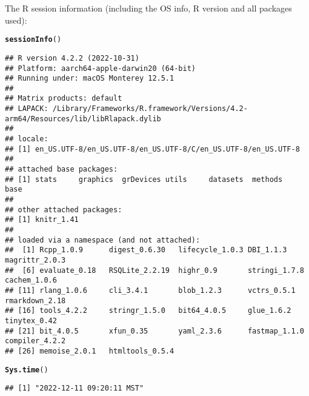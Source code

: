 \documentclass{article}\usepackage[]{graphicx}\usepackage[]{xcolor}
\makeatletter
\newcommand{\hlstd}[1]{\textcolor[rgb]{0.345,0.345,0.345}{#1}}%
\newcommand{\hlkwd}[1]{\textcolor[rgb]{0.737,0.353,0.396}{\textbf{#1}}}%
\newenvironment{kframe}{%
 \def\at@end@of@kframe{}%
 \ifinner\ifhmode%
  \def\at@end@of@kframe{\end{minipage}}%
  \begin{minipage}{\columnwidth}%
 \fi\fi%
 \def\FrameCommand##1{\hskip\@totalleftmargin \hskip-\fboxsep
 \colorbox{shadecolor}{##1}\hskip-\fboxsep
     \hskip-\linewidth \hskip-\@totalleftmargin \hskip\columnwidth}%
 \MakeFramed {\advance\hsize-\width
   \@totalleftmargin\z@ \linewidth\hsize
   \@setminipage}}%
 {\par\unskip\endMakeFramed%
 \at@end@of@kframe}
\newenvironment{knitrout}{}{} %
\makeatother
\begin{document}
The R session information (including the OS info, R version and all
packages used):

\begin{knitrout}
\color{fgcolor}\begin{kframe}
\begin{alltt}
\hlkwd{sessionInfo}\hlstd{()}
\end{alltt}
\begin{verbatim}
## R version 4.2.2 (2022-10-31)
## Platform: aarch64-apple-darwin20 (64-bit)
## Running under: macOS Monterey 12.5.1
## 
## Matrix products: default
## LAPACK: /Library/Frameworks/R.framework/Versions/4.2-arm64/Resources/lib/libRlapack.dylib
## 
## locale:
## [1] en_US.UTF-8/en_US.UTF-8/en_US.UTF-8/C/en_US.UTF-8/en_US.UTF-8
## 
## attached base packages:
## [1] stats     graphics  grDevices utils     datasets  methods   base     
## 
## other attached packages:
## [1] knitr_1.41
## 
## loaded via a namespace (and not attached):
##  [1] Rcpp_1.0.9      digest_0.6.30   lifecycle_1.0.3 DBI_1.1.3       magrittr_2.0.3 
##  [6] evaluate_0.18   RSQLite_2.2.19  highr_0.9       stringi_1.7.8   cachem_1.0.6   
## [11] rlang_1.0.6     cli_3.4.1       blob_1.2.3      vctrs_0.5.1     rmarkdown_2.18 
## [16] tools_4.2.2     stringr_1.5.0   bit64_4.0.5     glue_1.6.2      tinytex_0.42   
## [21] bit_4.0.5       xfun_0.35       yaml_2.3.6      fastmap_1.1.0   compiler_4.2.2 
## [26] memoise_2.0.1   htmltools_0.5.4
\end{verbatim}
\begin{alltt}
\hlkwd{Sys.time}\hlstd{()}
\end{alltt}
\begin{verbatim}
## [1] "2022-12-11 09:20:11 MST"
\end{verbatim}
\end{kframe}
\end{knitrout}
\end{document}
